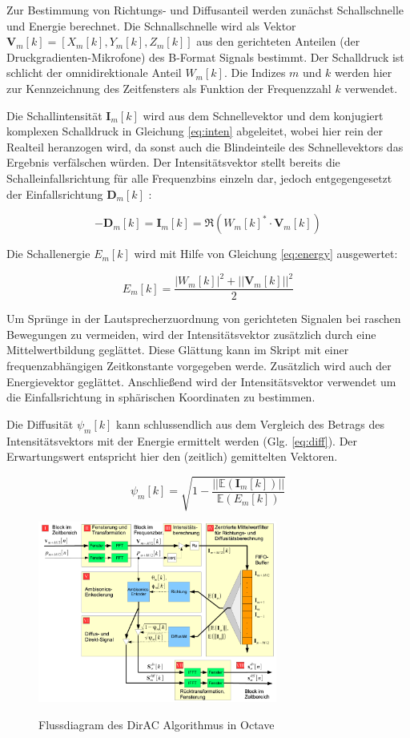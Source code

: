 Zur Bestimmung von Richtungs- und Diffusanteil werden zunächst Schallschnelle und Energie berechnet. Die Schnallschnelle wird als Vektor $\textbf{V}_{m}[k] = [X_{m}[k], Y_{m}[k], Z_{m}[k]]$ aus den gerichteten Anteilen (der Druckgradienten-Mikrofone) des B-Format Signals bestimmt. Der Schalldruck ist schlicht der omnidirektionale Anteil $W_{m}[k]$. Die Indizes $m$ und $k$ werden hier zur Kennzeichnung des Zeitfensters als Funktion der Frequenzzahl $k$ verwendet.

Die Schallintensität $\textbf{I}_{m}[k]$ wird aus dem Schnellevektor und dem konjugiert komplexen Schalldruck in Gleichung \ref{eq:inten} abgeleitet, wobei hier rein der Realteil heranzogen wird, da sonst auch die Blindeinteile des Schnellevektors das Ergebnis verfälschen würden. Der Intensitätsvektor stellt bereits die Schalleinfallsrichtung für alle Frequenzbins einzeln dar, jedoch entgegengesetzt der Einfallsrichtung $\textbf{D}_{m}[k]$ :

\begin{equation}
    -\textbf{D}_{m}[k] = \textbf{I}_{m}[k] = \Re(W_{m}[k]^{*} \cdot \textbf{V}_{m}[k])
    \label{eq:inten}
\end{equation}

Die Schallenergie $E_{m}[k]$ wird mit Hilfe von Gleichung \ref{eq:energy} ausgewertet:

\begin{equation}
    E_{m}[k] = \frac{|W_{m}[k]|^2+||\textbf{V}_{m}[k]||^2}{2}
    \label{eq:energy}
\end{equation}

Um Sprünge in der Lautsprecherzuordnung von gerichteten Signalen bei raschen Bewegungen zu vermeiden, wird der Intensitätsvektor zusätzlich durch eine Mittelwertbildung geglättet. Diese Glättung kann im Skript mit einer frequenzabhängigen Zeitkonstante vorgegeben werde. Zusätzlich wird auch der Energievektor geglättet. Anschließend wird der Intensitätsvektor verwendet um die Einfallsrichtung in sphärischen Koordinaten zu bestimmen.

Die Diffusität $\psi_{m}[k]$ kann schlussendlich aus dem Vergleich des Betrags des Intensitätsvektors mit der Energie ermittelt werden (Glg. \ref{eq:diff}). Der Erwartungswert entspricht hier den (zeitlich) gemittelten Vektoren.

\begin{equation}
    \psi_{m}[k] = \sqrt{1 - \frac{||\mathbb{E}(\textbf{I}_{m}[k])||}{\mathbb{E}(E_{m}[k])}}
    \label{eq:diff}
\end{equation}

\begin{figure}[!ht]
  \centering
  \includegraphics[width=0.7\textwidth]{implementierung/plots/flow.png}
  \label{fig:flow}
  \caption{Flussdiagram des DirAC Algorithmus in Octave\protect\footnotemark}
\end{figure}

